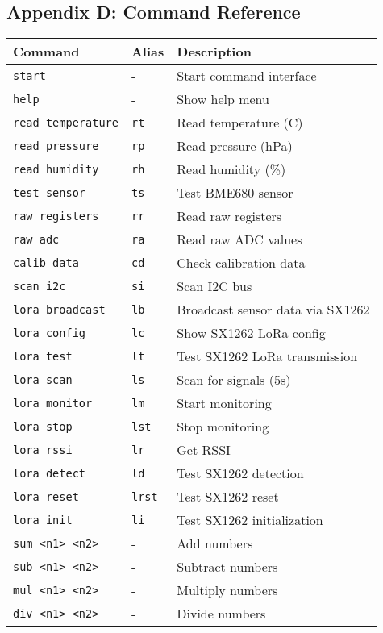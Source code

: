 \documentclass[11pt,a4paper]{article}
\begin{document}
\subsection{Appendix D: Command Reference}
\begin{longtable}{|l|l|l|}
\hline
\textbf{Command} & \textbf{Alias} & \textbf{Description} \\
\hline
\endhead
\hline
\endfoot
\texttt{start} & - & Start command interface \\
\hline
\texttt{help} & - & Show help menu \\
\hline
\texttt{read temperature} & \texttt{rt} & Read temperature (C) \\
\hline
\texttt{read pressure} & \texttt{rp} & Read pressure (hPa) \\
\hline
\texttt{read humidity} & \texttt{rh} & Read humidity (\%) \\
\hline
\texttt{test sensor} & \texttt{ts} & Test BME680 sensor \\
\hline
\texttt{raw registers} & \texttt{rr} & Read raw registers \\
\hline
\texttt{raw adc} & \texttt{ra} & Read raw ADC values \\
\hline
\texttt{calib data} & \texttt{cd} & Check calibration data \\
\hline
\texttt{scan i2c} & \texttt{si} & Scan I2C bus \\
\hline
\texttt{lora broadcast} & \texttt{lb} & Broadcast sensor data via SX1262 \\
\hline
\texttt{lora config} & \texttt{lc} & Show SX1262 LoRa config \\
\hline
\texttt{lora test} & \texttt{lt} & Test SX1262 LoRa transmission \\
\hline
\texttt{lora scan} & \texttt{ls} & Scan for signals (5s) \\
\hline
\texttt{lora monitor} & \texttt{lm} & Start monitoring \\
\hline
\texttt{lora stop} & \texttt{lst} & Stop monitoring \\
\hline
\texttt{lora rssi} & \texttt{lr} & Get RSSI \\
\hline
\texttt{lora detect} & \texttt{ld} & Test SX1262 detection \\
\hline
\texttt{lora reset} & \texttt{lrst} & Test SX1262 reset \\
\hline
\texttt{lora init} & \texttt{li} & Test SX1262 initialization \\
\hline
\texttt{sum <n1> <n2>} & - & Add numbers \\
\hline
\texttt{sub <n1> <n2>} & - & Subtract numbers \\
\hline
\texttt{mul <n1> <n2>} & - & Multiply numbers \\
\hline
\texttt{div <n1> <n2>} & - & Divide numbers \\
\hline
\end{longtable}
\end{document}
